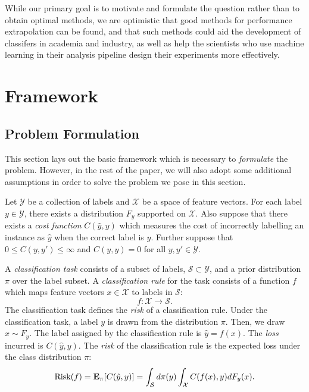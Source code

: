 \documentclass[12pt]{article}
\begin{document}
While our primary goal is to motivate and formulate the question
rather than to obtain optimal methods, we are optimistic that good
methods for performance extrapolation can be found, and that such
methods could aid the development of classifers in academia and
industry, as well as help the scientists who use machine learning in
their analysis pipeline design their experiments more effectively.


\section{Framework}\label{sec:formulation}

\subsection{Problem Formulation}

This section lays out the basic framework which is necessary to
\emph{formulate} the problem.  However, in the rest of the paper, we
will also adopt some additional assumptions in order to solve the
problem we pose in this section.

Let $\mathcal{Y}$ be a collection of labels and $\mathcal{X}$ be a
space of feature vectors.  For each label $y \in \mathcal{Y}$, there
exists a distribution $F_y$ supported on $\mathcal{X}$.  Also suppose
that there exists a \emph{cost function} $C(\hat{y}, y)$ which
measures the cost of incorrectly labelling an instance as $\hat{y}$
when the correct label is $y$.  Further suppose that $0 \leq C(y, y')
\leq \infty$ and $C(y, y)=0$ for all $y, y' \in \mathcal{Y}$.

A \emph{classification task} consists of a subset of labels,
$\mathcal{S} \subset \mathcal{Y}$, and a prior distribution $\pi$ over
the label subset.  A \emph{classification rule} for the task consists
of a function $f$ which maps feature vectors $x \in \mathcal{X}$ to
labels in $\mathcal{S}$:
\[
f: \mathcal{X} \to \mathcal{S}.
\]
The classification task defines the \emph{risk} of a classification
rule.  Under the classification task, a label $y$ is drawn from the
distribution $\pi$.  Then, we draw $x \sim F_y$.  The label assigned
by the classification rule is $\hat{y} = f(x)$.  The \emph{loss}
incurred is $C(\hat{y}, y)$.  The \emph{risk} of the classification
rule is the expected loss under the class distribution $\pi$:
\[
\text{Risk}(f) = \textbf{E}_\pi[C(\hat{y}, y)] = \int_\mathcal{S} d \pi(y) \int_{\mathcal{X}} C(f(x), y) dF_y(x).
\]
\end{document}
